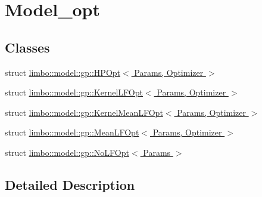 \hypertarget{group__model__opt}{}\section{Model\+\_\+opt}
\label{group__model__opt}
\subsection*{Classes}
\begin{DoxyCompactItemize}
\item 
struct \hyperlink{structlimbo_1_1model_1_1gp_1_1_h_p_opt}{limbo\+::model\+::gp\+::\+H\+P\+Opt$<$ Params, Optimizer $>$}
\item 
struct \hyperlink{structlimbo_1_1model_1_1gp_1_1_kernel_l_f_opt}{limbo\+::model\+::gp\+::\+Kernel\+L\+F\+Opt$<$ Params, Optimizer $>$}
\item 
struct \hyperlink{structlimbo_1_1model_1_1gp_1_1_kernel_mean_l_f_opt}{limbo\+::model\+::gp\+::\+Kernel\+Mean\+L\+F\+Opt$<$ Params, Optimizer $>$}
\item 
struct \hyperlink{structlimbo_1_1model_1_1gp_1_1_mean_l_f_opt}{limbo\+::model\+::gp\+::\+Mean\+L\+F\+Opt$<$ Params, Optimizer $>$}
\item 
struct \hyperlink{structlimbo_1_1model_1_1gp_1_1_no_l_f_opt}{limbo\+::model\+::gp\+::\+No\+L\+F\+Opt$<$ Params $>$}
\end{DoxyCompactItemize}


\subsection{Detailed Description}
